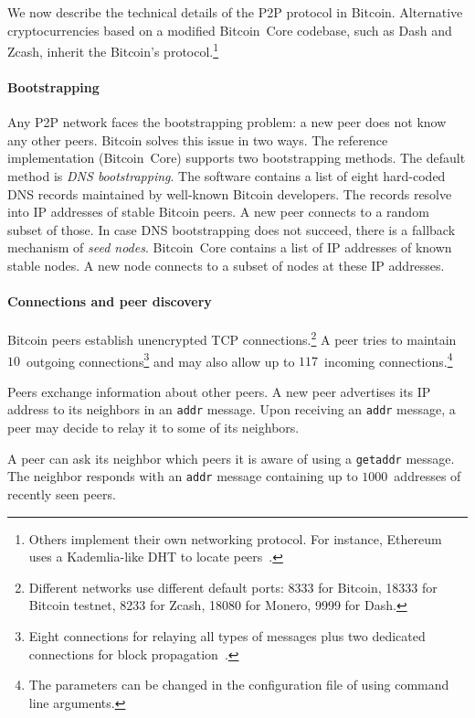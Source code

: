 We now describe the technical details of the P2P protocol in Bitcoin.
Alternative cryptocurrencies based on a modified Bitcoin~Core codebase, such as Dash and Zcash, inherit the Bitcoin's protocol.\footnote{Others implement their own networking protocol. For instance, Ethereum uses a Kademlia-like DHT to locate peers~\cite{Henningsen2019}.}

\paragraph{Bootstrapping}

Any P2P network faces the bootstrapping problem: a new peer does not know any other peers.
Bitcoin solves this issue in two ways.
The reference implementation (Bitcoin~Core) supports two bootstrapping methods.
The default method is \textit{DNS bootstrapping}.
The software contains a list of eight hard-coded DNS records maintained by well-known Bitcoin developers.
The records resolve into IP addresses of stable Bitcoin peers.
A new peer connects to a random subset of those.
In case DNS bootstrapping does not succeed, there is a fallback mechanism of \textit{seed nodes}.
Bitcoin~Core contains a list of IP addresses of known stable nodes.
A new node connects to a subset of nodes at these IP addresses.


\paragraph{Connections and peer discovery}

Bitcoin peers establish unencrypted TCP connections.\footnote{Different networks use different default ports: 8333 for Bitcoin, 18333 for Bitcoin testnet, 8233 for Zcash, 18080 for Monero, 9999 for Dash.}
A peer tries to maintain $10$~outgoing connections\footnote{Eight connections for relaying all types of messages plus two dedicated connections for block propagation~\cite{Daftuar2019}.} and may also allow up to $117$~incoming connections.\footnote{The parameters can be changed in the configuration file of using command line arguments.}

Peers exchange information about other peers.
A new peer advertises its IP address to its neighbors in an \texttt{addr} message.
Upon receiving an \texttt{addr} message, a peer may decide to relay it to some of its neighbors.

A peer can ask its neighbor which peers it is aware of using a \texttt{getaddr} message.
The neighbor responds with an \texttt{addr} message containing up to $1000$~addresses of recently seen peers.

